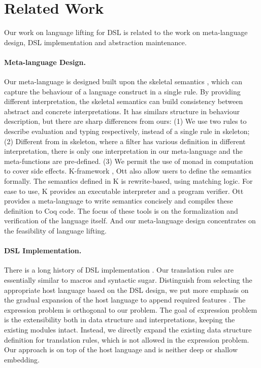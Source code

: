 \section{Related Work}

Our work on language lifting for DSL is related to the work on meta-language design, DSL implementation and abstraction maintenance.

\paragraph{Meta-language Design.}
Our meta-language is designed built upon the skeletal semantics \cite{skeleton},
 which can capture the behaviour of a language construct in a single rule.
By providing different interpretation,
 the skeletal semantics can build consistency between abstract and concrete interpretations.
It has similars structure in behaviour description,
 but there are sharp differences from ours:
(1) We use two rules to describe evaluation and typing respectively, instead of a single rule in skeleton;
(2) Different from in skeleton, where a filter has various definition in different interpretation, 
 there is only one interpretation in our meta-language and the meta-functions are pre-defined.
(3) We permit the use of monad in computation to cover side effects.
K-framework \cite{K-framework}, Ott \cite{Ott} also allow users to define the semantics formally.
The semantics defined in K is rewrite-based, using matching logic.
For ease to use, K provides an executable interpreter and a program verifier.
Ott provides a meta-language to write semantics concisely and compiles these definition to Coq code.
The focus of these tools is on the formalization and verification of the language itself.
And our meta-language design concentrates on the feasibility of language lifting.

\paragraph{DSL Implementation.}
There is a long history of DSL implementation \cite{MartinDSL,when-how-dsl}.
Our translation rules are essentially similar to macros and syntactic sugar.
Distinguish from selecting the appropriate host language based on the DSL design,
 we put more emphasis on the gradual expansion of the host language to append required features \cite{MoggiMeta}.
The expression problem \cite{expr-problem} is orthogonal to our problem.
The goal of expression problem is the extensibility both in data structure and interpretations,
 keeping the existing modules intact.
Instead, we directly expand the existing data structure definition for translation rules,
 which is not allowed in the expression problem.
Our approach is on top of the host language and is neither deep or shallow embedding.

